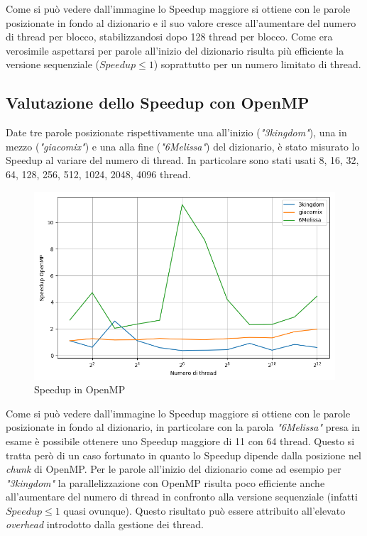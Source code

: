 \documentclass[10pt,twocolumn,letterpaper]{article}
\begin{document}
Come si può vedere dall'immagine lo Speedup maggiore si ottiene con le parole posizionate in fondo al dizionario e il suo valore cresce all'aumentare del numero di thread per blocco, stabilizzandosi dopo 128 thread per blocco. Come era verosimile aspettarsi per parole all'inizio del dizionario risulta più efficiente la versione sequenziale ($Speedup \le 1$) soprattutto per un numero limitato di thread.

\subsection{Valutazione dello Speedup con OpenMP}
Date tre parole posizionate rispettivamente una all'inizio (\textit{"3kingdom"}), una in mezzo (\textit{"giacomix"}) e una alla fine (\textit{"6Melissa"}) del dizionario, è stato misurato lo Speedup al variare del numero di thread.\newline
In particolare sono stati usati 8, 16, 32, 64, 128, 256, 512, 1024, 2048, 4096 thread.

\begin{figure}[h]
\includegraphics[width=\linewidth]{Plots/tempi_openmp.png}
\caption{Speedup in OpenMP}
\end{figure}

Come si può vedere dall'immagine lo Speedup maggiore si ottiene con le parole posizionate in fondo al dizionario, in particolare con la parola \textit{"6Melissa"} presa in esame è possibile ottenere uno Speedup maggiore di 11 con 64 thread. Questo si tratta però di un caso fortunato in quanto lo Speedup dipende dalla posizione nel \textit{chunk} di OpenMP.
Per le parole all'inizio del dizionario come ad esempio per \textit{"3kingdom"} la parallelizzazione con OpenMP risulta poco efficiente anche all'aumentare del numero di thread in confronto alla versione sequenziale (infatti $Speedup \le 1$ quasi ovunque). Questo risultato può essere attribuito all'elevato \textit{overhead} introdotto dalla gestione dei thread.
\end{document}
